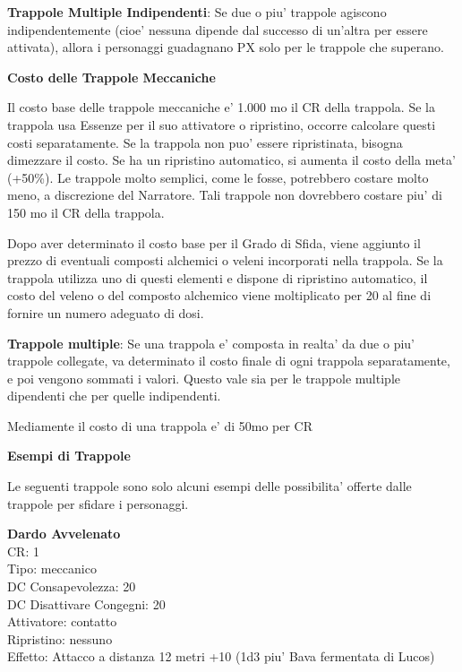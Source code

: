 \documentclass[a4paper,11pt,twoside,openany]{book}
\begin{document}
{		\textbf{Trappole Multiple Indipendenti}: Se due o piu' trappole agiscono indipendentemente (cioe' nessuna dipende dal successo di un'altra per essere attivata), allora i personaggi guadagnano PX solo per le trappole
		che superano.
		
		\textbf{Costo delle Trappole Meccaniche}
		
		Il costo base delle trappole meccaniche e' 1.000 mo \texttimes{} il CR della trappola. Se la trappola usa Essenze per il suo attivatore o ripristino, occorre calcolare questi costi separatamente. Se la trappola non puo' essere ripristinata, bisogna dimezzare il costo. Se ha un ripristino automatico, si aumenta il costo della meta' (+50\%). Le trappole molto semplici, come le fosse, potrebbero costare molto meno, a discrezione del Narratore. Tali trappole non dovrebbero costare piu' di 150 mo \texttimes{} il CR della trappola. 
		
		Dopo aver determinato il costo base per il Grado di Sfida, viene aggiunto il prezzo di eventuali composti alchemici o veleni incorporati nella trappola. Se la trappola utilizza uno di questi elementi e dispone di ripristino automatico, il costo del veleno o del composto alchemico viene moltiplicato per 20 al fine di fornire un numero adeguato di dosi.
		
		\textbf{Trappole multiple}: Se una trappola e' composta in realta' da due o piu' trappole collegate, va determinato il costo finale di ogni trappola separatamente, e poi vengono sommati i valori. Questo vale sia per le trappole multiple dipendenti che per quelle indipendenti.
		
		Mediamente il costo di una trappola e' di 50mo per CR
		
		\pagebreak
		
		\textbf{Esempi di Trappole}
		
		Le seguenti trappole sono solo alcuni esempi delle possibilita' offerte
		dalle trappole per sfidare i personaggi.
		
		\begin{multicols}{2}
			
			\textbf{Dardo Avvelenato}\\
			CR: 1 \\
			Tipo: meccanico \\
			DC Consapevolezza: 20 \\
			DC Disattivare Congegni: 20 \\
			Attivatore: contatto \\
			Ripristino: nessuno \\
			Effetto: Attacco a distanza 12 metri +10 (1d3 piu' Bava fermentata di Lucos)\\
			

\end{multicols}}
\end{document}
